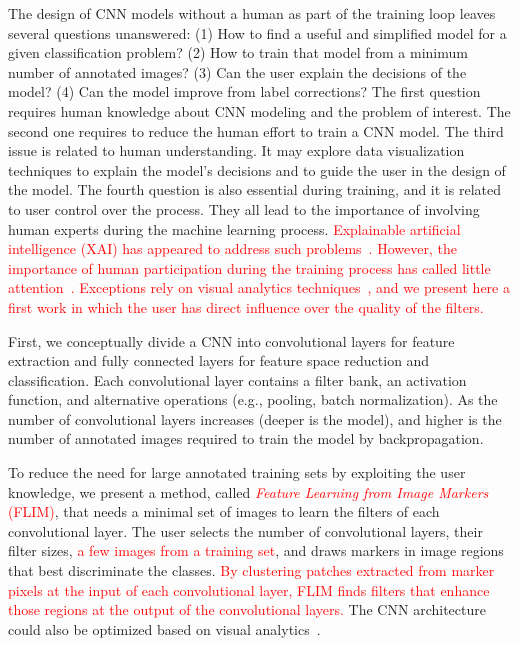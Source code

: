 \documentclass[journal, twoside]{IEEEtran}
\begin{document}
The design of CNN models without a human as part of the training loop leaves several questions unanswered: (1) How to find a useful and simplified model for a given classification problem? (2) How to train that model from a minimum number of annotated images?  (3) Can the user explain the decisions of the model? (4) Can the model improve from label corrections? The first question requires human knowledge about CNN modeling and the problem of interest. The second one requires to reduce the human effort to train a CNN model. The third issue is related to human understanding. It may explore data visualization techniques to explain the model's decisions and to guide the user in the design of the model. The fourth question is also essential during training, and it is related to user control over the process. They all lead to the importance of involving human experts during the machine learning process. \textcolor{red}{Explainable artificial intelligence (XAI) has appeared to address such problems~\cite{rauber2016visualizing,arrietaInfoFusion2020}. However, the importance of human participation during the training process has called little attention~\cite{AngelovNN2020}. Exceptions rely on visual analytics techniques~\cite{GarciaIJCNN2019,SpinnerTVCG2020}, and we present here a first work in which the user has direct influence over the quality of the filters.}

First, we conceptually divide a CNN into convolutional layers for feature extraction and fully connected layers for feature space reduction and classification. Each convolutional layer contains a filter bank, an activation function, and alternative operations (e.g., pooling, batch normalization).  As the number of convolutional layers increases (deeper is the model), and higher is the number of annotated images required to train the model by backpropagation. 

To reduce the need for large annotated training sets by exploiting the user knowledge, we present a method, called \textcolor{red}{\emph{Feature Learning from Image Markers} (FLIM)}, that needs a minimal set of images to learn the filters of each convolutional layer. The user selects the number of convolutional layers, their filter sizes, \textcolor{red}{a few images from a training set}, and draws markers in image regions that best discriminate the classes. \textcolor{red}{By clustering patches extracted from marker pixels at the input of each convolutional layer, FLIM finds filters that enhance those regions at the output of the convolutional layers.} The CNN architecture could also be optimized based on visual analytics~\cite{SpinnerTVCG2020}.
\end{document}
